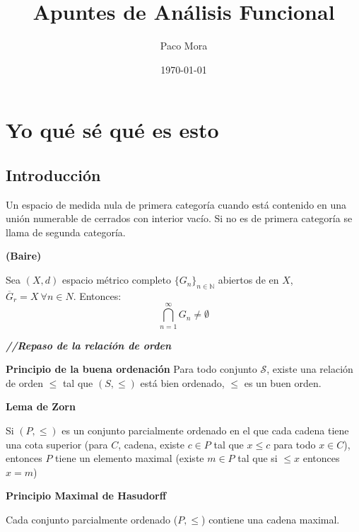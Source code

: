 \documentclass[openany]{book}
\title{Apuntes de Análisis Funcional}
\author{Paco Mora}
\date{\today}
\begin{document}
\maketitle

\chapter{Yo qué sé qué es esto}

\section{Introducción}

\begin{definition}
    
    Un espacio de medida nula de primera categoría cuando está contenido en una unión numerable de cerrados con interior vacío. Si no es de primera categoría se llama de segunda categoría.
\end{definition}


\begin{theorem}
    \textbf{(Baire)}    

    Sea $ (X,d) $ espacio métrico completo $ \{G_n\}_{n \in \mathbb{N}} $ abiertos de en $ X $, $ \overline{G}_{r} = X\ \forall n \in N $. Entonces:
    $$ \bigcap_{n=1}^{\infty}G_n \ne \emptyset $$
\end{theorem}

\textit{\textbf{//Repaso de la relación de orden}}

\begin{theorem}
    \textbf{Principio de la buena ordenación }
    Para todo conjunto $ \mathcal{S}   $, existe una relación de orden $ \leq  $ tal que $ (S, \leq ) $ está bien ordenado, $ \leq  $ es un buen orden.
\end{theorem}


\begin{theorem}
    \textbf{Lema de Zorn}

    Si $ (P,\leq ) $ es un conjunto parcialmente ordenado en el que cada cadena tiene una cota superior (para $ C $, cadena, existe $ c \in P $ tal que $ x\leq c $ para todo $ x \in C $), entonces $ P $ tiene un elemento maximal (existe $  m \in P $ tal que si $ \leq x $ entonces $ x = m $)
\end{theorem}

\begin{theorem}
    \textbf{Principio Maximal de Hasudorff}

    Cada conjunto parcialmente ordenado ($ P,\leq  $) contiene una cadena maximal.

\end{theorem}
\end{document}
